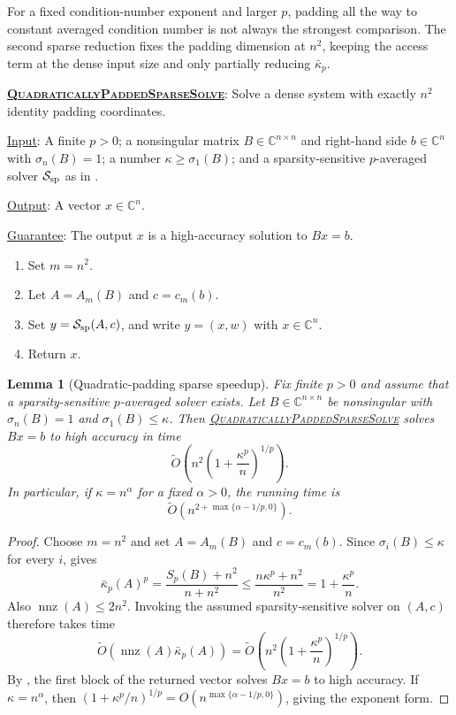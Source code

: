 \documentclass[11pt]{article}
\newenvironment{fminipage}%
  {\begin{Sbox}\begin{minipage}}%
  {\end{minipage}\end{Sbox}\fbox{\TheSbox}}
\newenvironment{algbox}[0]{%
\vskip 0.2in
\noindent
\begin{fminipage}{6.3in}
}{%
\end{fminipage}
\vskip 0.2in
}
\newtheorem{lemma}{Lemma}[section]
\begin{document}
For a fixed condition-number exponent and larger $p$, padding all the way to
constant averaged condition number is not always the strongest comparison.
The second sparse reduction fixes the padding dimension at $n^2$, keeping the
access term at the dense input size and only partially reducing
$\bar{\kappa}_p$.

\begin{algbox}
\textbf{\uline{\textsc{QuadraticallyPaddedSparseSolve}}}: Solve a dense
system with exactly $n^2$ identity padding coordinates.
\label{alg:quadratically-padded-sparse-solve}

\uline{Input}: A finite $p>0$; a nonsingular matrix
$B\in\mathbb{C}^{n\times n}$ and right-hand side $b\in\mathbb{C}^n$ with
$\sigma_n(B)=1$; a number $\kappa\geq\sigma_1(B)$; and a sparsity-sensitive
$p$-averaged solver $\mathcal{S}_{\rm sp}$ as in
.

\uline{Output}: A vector $x\in\mathbb{C}^n$.

\uline{Guarantee}: The output $x$ is a high-accuracy solution to $Bx=b$.

\begin{enumerate}[leftmargin=*]
  \item Set $m=n^2$.
  \item Let $A=A_m(B)$ and $c=c_m(b)$.
  \item Set $y=\mathcal{S}_{\rm sp}(A,c)$, and write $y=(x,w)$ with
  $x\in\mathbb{C}^n$.
  \item Return $x$.
\end{enumerate}
\end{algbox}

\begin{lemma}[Quadratic-padding sparse speedup]
\label{lem:sparse-quadratic-padding-speedup}
Fix finite $p>0$ and assume that a sparsity-sensitive $p$-averaged solver
exists.  Let $B\in\mathbb{C}^{n\times n}$ be nonsingular with
$\sigma_n(B)=1$ and $\sigma_1(B)\leq\kappa$.  Then
\hyperref[alg:quadratically-padded-sparse-solve]{\textsc{QuadraticallyPaddedSparseSolve}}
solves $Bx=b$ to high accuracy in time
\[
  \widetilde{O}\left(n^2\left(1+\frac{\kappa^p}{n}\right)^{1/p}\right).
\]
In particular, if $\kappa=n^{\alpha}$ for a fixed $\alpha>0$, the running time
is
\[
  \widetilde{O}\left(n^{2+\max\{\alpha-1/p,0\}}\right).
\]
\end{lemma}

\begin{proof}
Choose $m=n^2$ and set $A=A_m(B)$ and $c=c_m(b)$.  Since
$\sigma_i(B)\leq\kappa$ for every $i$,  gives
\[
  \bar{\kappa}_p(A)^p
  =
  \frac{S_p(B)+n^2}{n+n^2}
  \leq
  \frac{n\kappa^p+n^2}{n^2}
  =
  1+\frac{\kappa^p}{n}.
\]
Also $\operatorname{nnz}(A)\leq 2n^2$.  Invoking the assumed
sparsity-sensitive solver on $(A,c)$ therefore takes time
\[
  \widetilde{O}\left(\operatorname{nnz}(A)\bar{\kappa}_p(A)\right)
  =
  \widetilde{O}\left(n^2
  \left(1+\frac{\kappa^p}{n}\right)^{1/p}\right).
\]
By , the first block of the returned vector
solves $Bx=b$ to high accuracy.  If $\kappa=n^{\alpha}$, then
$(1+\kappa^p/n)^{1/p}=O(n^{\max\{\alpha-1/p,0\}})$, giving the exponent form.
\end{proof}
\end{document}
